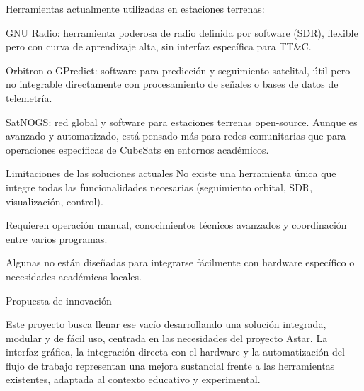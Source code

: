 
Herramientas actualmente utilizadas en estaciones terrenas:

GNU Radio: herramienta poderosa de radio definida por software (SDR), flexible pero con curva de aprendizaje alta, sin interfaz específica para TT\&C.

Orbitron o GPredict: software para predicción y seguimiento satelital, útil pero no integrable directamente con procesamiento de señales o bases de datos de telemetría.

SatNOGS: red global y software para estaciones terrenas open-source. Aunque es avanzado y automatizado, está pensado más para redes comunitarias que para operaciones específicas de CubeSats en entornos académicos.

Limitaciones de las soluciones actuales
No existe una herramienta única que integre todas las funcionalidades necesarias (seguimiento orbital, SDR, visualización, control).

Requieren operación manual, conocimientos técnicos avanzados y coordinación entre varios programas.

Algunas no están diseñadas para integrarse fácilmente con hardware específico o necesidades académicas locales.

Propuesta de innovación

Este proyecto busca llenar ese vacío desarrollando una solución integrada, modular y de fácil uso, centrada en las necesidades del proyecto Astar. La interfaz gráfica, la integración directa con el hardware y la automatización del flujo de trabajo representan una mejora sustancial frente a las herramientas existentes, adaptada al contexto educativo y experimental.

